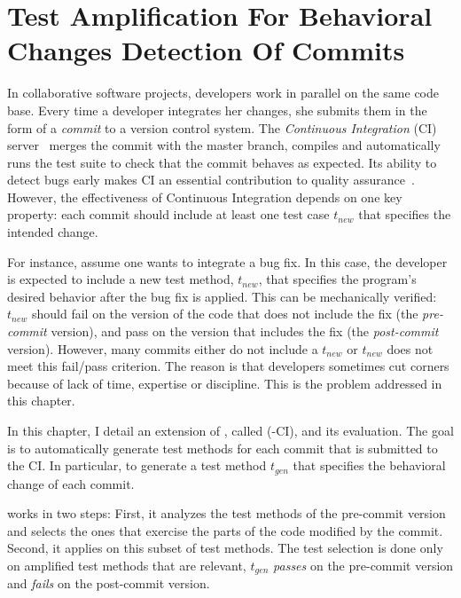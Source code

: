 \chapter{Test Amplification For Behavioral Changes Detection Of Commits}
\label{chap:dci}

\graphicspath{{.}{chapitres/behavioral-change-detection-for-commit/}}

\minitoc

In collaborative software projects, developers work in parallel on the same code base. 
Every time a developer integrates her changes, she submits them in the form of a \emph{commit} to a version control system.
The \emph{Continuous Integration} (CI) server~\cite{fowler2006continuous} merges the commit with the master branch, compiles and automatically runs the test suite to check that the commit behaves as expected.
Its ability to detect bugs early makes CI an essential contribution to quality assurance~\cite{Hilton:2016:UsageCI,duvall2007continuous}.
However, the effectiveness of Continuous Integration depends on one key property: 
each commit should include at least one test case $t_{new}$ that specifies the intended change.

For instance, assume one wants to integrate a bug fix.
In this case, the developer is expected to include a new test method, $t_{new}$, that specifies the program's desired behavior after the bug fix is applied.
This can be mechanically verified: $t_{new}$ should fail on the version of the code that does not include the fix (the \emph{pre-commit} version), and pass on the version that includes the fix (the \emph{post-commit} version).
However, many commits either do not include a $t_{new}$ or $t_{new}$ does not meet this fail/pass criterion.
The reason is that developers sometimes cut corners because of lack of time, expertise or discipline. 
This is the problem addressed in this chapter.

In this chapter, I detail an extension of \dspot, called \DCI(\dspot-CI), and its evaluation.
The goal is to automatically generate test methods for each commit that is submitted to the CI.
In particular, to generate a test method $t_{gen}$ that specifies the behavioral change of each commit.

\DCI works in two steps:
First, it analyzes the test methods of the pre-commit version and selects the ones that exercise the parts of the code modified by the commit.
Second, it applies \dspot on this subset of test methods.
The test selection is done only on amplified test methods that are relevant, \ie $t_{gen}$ \textit{passes} on the pre-commit version and \textit{fails} on the post-commit version.

